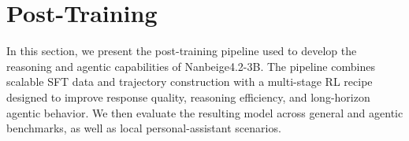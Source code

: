 \section{Post-Training}

In this section, we present the post-training pipeline used to develop the reasoning and agentic capabilities of Nanbeige4.2-3B. The pipeline combines scalable SFT data and trajectory construction with a multi-stage RL recipe designed to improve response quality, reasoning efficiency, and long-horizon agentic behavior. We then evaluate the resulting model across general and agentic benchmarks, as well as local personal-assistant scenarios.







